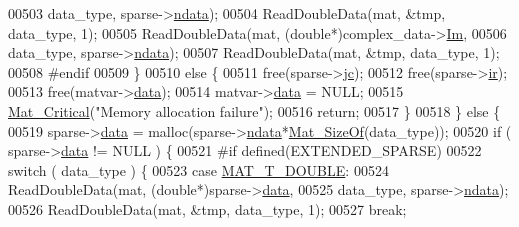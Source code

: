 \begin{DoxyCode}
{{00503                             data\_type, sparse->\hyperlink{group___m_a_t_a1beb8a8c58a808207cbea650563a9b63}{ndata});
00504                         ReadDoubleData(mat, &tmp, data\_type, 1);
00505                         ReadDoubleData(mat, (\textcolor{keywordtype}{double}*)complex\_data->\hyperlink{group___m_a_t_a7182d10b0d3598415887376065440946}{Im},
00506                             data\_type, sparse->\hyperlink{group___m_a_t_a1beb8a8c58a808207cbea650563a9b63}{ndata});
00507                         ReadDoubleData(mat, &tmp, data\_type, 1);
00508 \textcolor{preprocessor}{#endif}
00509                     \}
00510                     \textcolor{keywordflow}{else} \{
00511                         free(sparse->\hyperlink{group___m_a_t_ad1e74cdc4f7eff1e47a670297c01da4b}{jc});
00512                         free(sparse->\hyperlink{group___m_a_t_a8d4c863d704edddec5cbfa15b2d719c8}{ir});
00513                         free(matvar->\hyperlink{group___m_a_t_a5672978efa230bbdecdf38ede781f7fa}{data});
00514                         matvar->\hyperlink{group___m_a_t_a5672978efa230bbdecdf38ede781f7fa}{data} = NULL;
00515                         \hyperlink{group__mat__util_gaf51f2bfbb5580f575e4dd79757e2b80c}{Mat\_Critical}(\textcolor{stringliteral}{"Memory allocation failure"});
00516                         \textcolor{keywordflow}{return};
00517                     \}
00518                 \} \textcolor{keywordflow}{else} \{
00519                     sparse->\hyperlink{group___m_a_t_ae2c648cb9eac4ce47f26cddb44246152}{data} = malloc(sparse->\hyperlink{group___m_a_t_a1beb8a8c58a808207cbea650563a9b63}{ndata}*\hyperlink{group__mat__util_gab6774aabdc124c540c1e7686d0804940}{Mat\_SizeOf}(data\_type));
00520                     \textcolor{keywordflow}{if} ( sparse->\hyperlink{group___m_a_t_ae2c648cb9eac4ce47f26cddb44246152}{data} != NULL ) \{
00521 \textcolor{preprocessor}{#if defined(EXTENDED\_SPARSE)}
00522                         \textcolor{keywordflow}{switch} ( data\_type ) \{
00523                             \textcolor{keywordflow}{case} \hyperlink{group___m_a_t_ggacf7b3b879282b7ab3a51190e49bf3453a31e721ecf7e188196f83c32838288797}{MAT\_T\_DOUBLE}:
00524                                 ReadDoubleData(mat, (\textcolor{keywordtype}{double}*)sparse->\hyperlink{group___m_a_t_ae2c648cb9eac4ce47f26cddb44246152}{data},
00525                                     data\_type, sparse->\hyperlink{group___m_a_t_a1beb8a8c58a808207cbea650563a9b63}{ndata});
00526                                 ReadDoubleData(mat, &tmp, data\_type, 1);
00527                                 \textcolor{keywordflow}{break};
}}
\end{DoxyCode}
